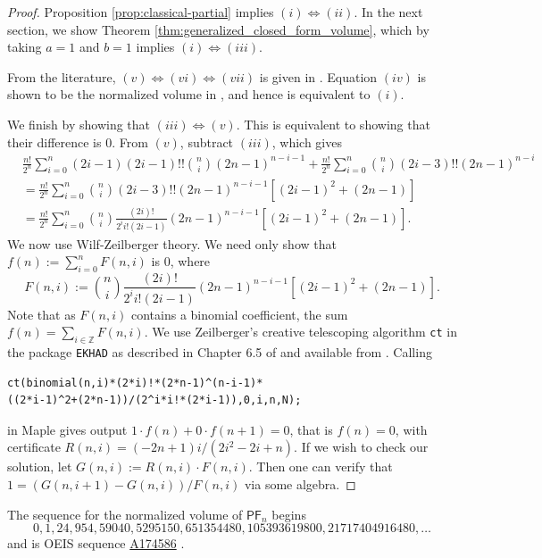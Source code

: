 \documentclass[11pt]{amsart}
\theoremstyle{definition}
\newcommand{\0}{\emptyset}
\newcommand{\Z}{\mathbb{Z}}
\newcommand{\PF}{\mathsf{PF}}
\begin{document}
\begin{proof}
Proposition \ref{prop:classical-partial} implies $(i) \iff (ii)$.
In the next section, we show Theorem \ref{thm:generalized_closed_form_volume}, which by taking $a=1$ and $b=1$ implies $(i) \iff (iii)$.


From the literature, $(v) \iff (vi) \iff (vii)$ is given in \cite{She}. Equation $(iv)$ is shown to be the normalized volume in \cite{Sto}, and hence is equivalent to $(i)$.

We finish by showing that $(iii) \iff (v)$. This is equivalent to showing that their difference is $0$. From $(v)$, subtract $(iii)$, which gives 
\begin{align*}
    &\frac{n!}{2^n}\sum_{i=0}^{n} (2i-1)(2i-1)!!\binom{n}{i}(2n-1)^{n-i-1}+ \frac{n!}{2^n}\sum_{i=0}^n \binom{n}{i}(2i-3)!!(2n-1)^{n-i}\\
    &= \frac{n!}{2^n}\sum_{i=0}^{n}\binom{n}{i}(2i-3)!!(2n-1)^{n-i-1}[(2i-1)^2 + (2n-1)]\\
    &= \frac{n!}{2^n}\sum_{i=0}^{n}\binom{n}{i}\frac{(2i)!}{2^i i! (2i-1)}(2n-1)^{n-i-1}[(2i-1)^2 + (2n-1)].
\end{align*}
We now use Wilf-Zeilberger theory. 
We need only show that $f(n) := \sum_{i=0}^n F(n,i)$ is $0$, where
\[ F(n,i) := \binom{n}{i}\frac{(2i)!}{2^i i! (2i-1)}(2n-1)^{n-i-1}[(2i-1)^2 + (2n-1)].\]
Note that as $F(n,i)$ contains a binomial coefficient, the sum $f(n)= \sum_{i \in \Z} F(n,i)$.
We use Zeilberger's creative telescoping algorithm \texttt{ct} in the package \texttt{EKHAD} as described in Chapter 6.5 of \cite{PWZ} and available from \cite{Zei}. Calling
\begin{center}
\begin{BVerbatim}
ct(binomial(n,i)*(2*i)!*(2*n-1)^(n-i-1)*
((2*i-1)^2+(2*n-1))/(2^i*i!*(2*i-1)),0,i,n,N);
\end{BVerbatim}
\end{center}
in Maple gives output $1 \cdot f(n) + 0 \cdot f(n+1)= 0$, that is $f(n) = 0$, with certificate $R(n,i) = (-2n+1)i/(2i^2-2i+n)$. If we wish to check our solution, let $G(n,i) := R(n,i)\cdot F(n,i)$. 
Then one can verify that $1 = (G(n,i+1) - G(n,i))/F(n,i)$ via some algebra.
\end{proof}


The sequence for the normalized volume of $\PF_n$ begins \[0, 1, 24, 954, 59040, 5295150, 651354480, 105393619800, 21717404916480, \ldots\] and is OEIS sequence \href{http://oeis.org/A174586}{A174586} \cite{OEIS}.
\end{document}
